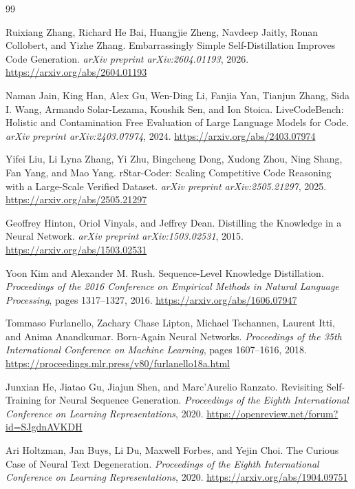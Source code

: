 \documentclass[11pt]{article}
\begin{document}
\begin{thebibliography}{99}

Ruixiang Zhang, Richard He Bai, Huangjie Zheng, Navdeep Jaitly,
Ronan Collobert, and Yizhe Zhang.
\newblock Embarrassingly Simple Self-Distillation Improves Code Generation.
\newblock \emph{arXiv preprint arXiv:2604.01193}, 2026.
\newblock \url{https://arxiv.org/abs/2604.01193}

Naman Jain, King Han, Alex Gu, Wen-Ding Li, Fanjia Yan,
Tianjun Zhang, Sida I. Wang, Armando Solar-Lezama, Koushik Sen,
and Ion Stoica.
\newblock LiveCodeBench: Holistic and Contamination Free Evaluation
of Large Language Models for Code.
\newblock \emph{arXiv preprint arXiv:2403.07974}, 2024.
\newblock \url{https://arxiv.org/abs/2403.07974}

Yifei Liu, Li Lyna Zhang, Yi Zhu, Bingcheng Dong, Xudong Zhou,
Ning Shang, Fan Yang, and Mao Yang.
\newblock rStar-Coder: Scaling Competitive Code Reasoning with a
Large-Scale Verified Dataset.
\newblock \emph{arXiv preprint arXiv:2505.21297}, 2025.
\newblock \url{https://arxiv.org/abs/2505.21297}

Geoffrey Hinton, Oriol Vinyals, and Jeffrey Dean.
\newblock Distilling the Knowledge in a Neural Network.
\newblock \emph{arXiv preprint arXiv:1503.02531}, 2015.
\newblock \url{https://arxiv.org/abs/1503.02531}

Yoon Kim and Alexander M. Rush.
\newblock Sequence-Level Knowledge Distillation.
\newblock \emph{Proceedings of the 2016 Conference on Empirical Methods
in Natural Language Processing}, pages 1317--1327, 2016.
\newblock \url{https://arxiv.org/abs/1606.07947}

Tommaso Furlanello, Zachary Chase Lipton, Michael Tschannen,
Laurent Itti, and Anima Anandkumar.
\newblock Born-Again Neural Networks.
\newblock \emph{Proceedings of the 35th International Conference on
Machine Learning}, pages 1607--1616, 2018.
\newblock \url{https://proceedings.mlr.press/v80/furlanello18a.html}

Junxian He, Jiatao Gu, Jiajun Shen, and Marc'Aurelio Ranzato.
\newblock Revisiting Self-Training for Neural Sequence Generation.
\newblock \emph{Proceedings of the Eighth International Conference on
Learning Representations}, 2020.
\newblock \url{https://openreview.net/forum?id=SJgdnAVKDH}

Ari Holtzman, Jan Buys, Li Du, Maxwell Forbes, and Yejin Choi.
\newblock The Curious Case of Neural Text Degeneration.
\newblock \emph{Proceedings of the Eighth International Conference on
Learning Representations}, 2020.
\newblock \url{https://arxiv.org/abs/1904.09751}


\end{thebibliography}
\end{document}
